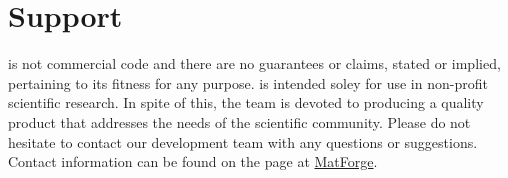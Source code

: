 \section{Support}
\MMSP is not commercial code and there are no guarantees or claims, stated or implied, pertaining to its fitness for any purpose.  \MMSP is intended soley for use in non-profit scientific research.  In spite of this, the \MMSP team is devoted to producing a quality product that addresses the needs of the scientific community.  Please do not hesitate to contact our development team with any questions or suggestions.  Contact information can be found on the \MMSP page at \href{https://matforge.org}{MatForge}.

